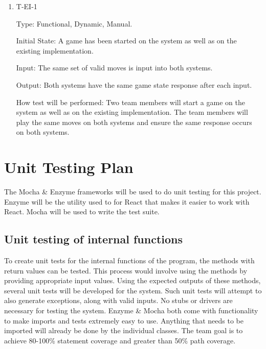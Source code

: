 \documentclass[12pt, titlepage]{article}
\begin{document}
    \begin{enumerate}
    
        \item{T-EI-1\\}
        
            Type: Functional, Dynamic, Manual.
            					
            Initial State: A game has been started on the system as well as on the existing implementation.
            					
            Input: The same set of valid moves is input into both systems.
            					
            Output: Both systems have the same game state response after each input.
            					
            How test will be performed: Two team members will start a game on the system as well as on the existing implementation. The team members will play the same moves on both systems and ensure the same response occurs on both systems.
			
    \end{enumerate}

\section{Unit Testing Plan}
		
    The Mocha \& Enzyme frameworks will be used to do unit testing for this project. Enzyme will be the utility used to for React that makes it easier to work with React. Mocha will be used to write the test suite.

\subsection{Unit testing of internal functions}

	To create unit tests for the internal functions of the program, the methods with return values can be tested. This process would involve using the methods by providing appropriate input values. Using the expected outputs of these methods, several unit tests will be developed for the system. Such unit tests will attempt to also generate exceptions, along with valid inputs. No stubs or drivers are necessary for testing the system. Enzyme \& Mocha both come with functionality to make imports and tests extremely easy to use. Anything that needs to be imported will already be done by the individual classes. The team goal is to achieve 80-100\% statement coverage and greater than 50\% path coverage.
	
\end{document}
